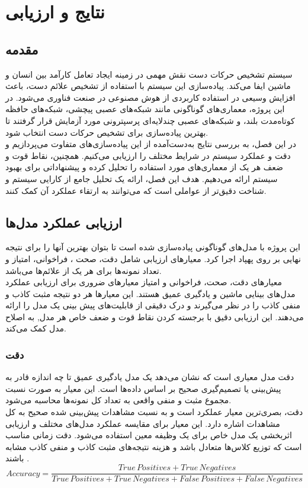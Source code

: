 \chapter{نتایج و ارزیابی}
\section{مقدمه}
سیستم تشخیص حرکات دست نقش مهمی در زمینه ایجاد تعامل کارآمد بین انسان و ماشین ایفا می‌کند. پیاده‌سازی این سیستم با استفاده از تشخیص علائم دست، باعث افزایش وسیعی در استفاده کاربردی از هوش مصنوعی  در صنعت فناوری می‌شود. در این پروژه، 
معماری‌های گوناگونی مانند شبکه‌های عصبی پیچشی، شبکه‌های حافظه کوتاه‌مدت بلند، و شبکه‌های عصبی چندلایه‌ای پرسپترونی مورد آزمایش قرار گرفتند تا بهترین پیاده‌سازی برای تشخیص حرکات دست انتخاب شود. 
\\
در این فصل، به بررسی نتایج به‌دست‌آمده از این پیاده‌سازی‌های متفاوت می‌پردازیم و دقت و عملکرد سیستم در شرایط مختلف را ارزیابی می‌کنیم. همچنین، نقاط قوت و ضعف هر یک از معماری‌های مورد استفاده 
را تحلیل کرده و پیشنهاداتی برای بهبود سیستم ارائه می‌دهیم. هدف این فصل، ارائه یک تحلیل جامع از کارایی سیستم و شناخت دقیق‌تر از عواملی است که می‌توانند به ارتقاء عملکرد آن کمک کنند.

\section{ارزیابی عملکرد مدل‌ها}

این پروژه با مدل‌های گوناگونی پیاده‌سازی شده است تا بتوان بهترین آنها را برای نتیجه نهایی بر روی پهپاد اجرا کرد. معیارهای ارزیابی شامل دقت، صحت ، فراخوانی، امتیاز  و
تعداد نمونه‌ها برای هر یک از علائم‌ها می‌باشد.
\\
معیار‌های دقت، صحت، فراخوانی و امتیاز  معیارهای ضروری برای ارزیابی عملکرد مدل‌های بینایی ماشین و یادگیری عمیق هستند. این معیار‌ها هر دو نتیجه مثبت کاذب و منفی کاذب را در نظر
می‌گیرند و درک دقیقی از قابلیت‌های پیش بینی یک مدل را ارائه می‌دهند. این ارزیابی دقیق با برجسته کردن نقاط قوت و ضعف خاص هر مدل, به اصلاح مدل کمک می‌کند.
\subsection{دقت}
دقت مدل معیاری است که نشان می‌دهد یک مدل یادگیری عمیق تا چه اندازه قادر به پیش‌بینی یا تصمیم‌گیری صحیح بر اساس داده‌ها است. این معیار به صورت نسبت مجموع مثبت و منفی واقعی به تعداد کل نمونه‌ها محاسبه می‌شود.
\\
دقت، بصری‌ترین معیار عملکرد است و به نسبت مشاهدات پیش‌بینی شده صحیح به کل مشاهدات اشاره دارد. این معیار برای مقایسه عملکرد مدل‌های مختلف و ارزیابی اثربخشی یک مدل خاص برای یک وظیفه معین استفاده می‌شود. دقت زمانی مناسب است که توزیع کلاس‌ها متعادل باشد و هزینه‌ نتیجه‌های مثبت کاذب و منفی کاذب مشابه باشند \cite{Accuracy53:online}.
\begin{equation}
    Accuracy = \frac{True \, Positives + True \, Negatives}{True \, Positives + True \, Negatives + False \, Positives + False \, Negatives}
\end{equation}


